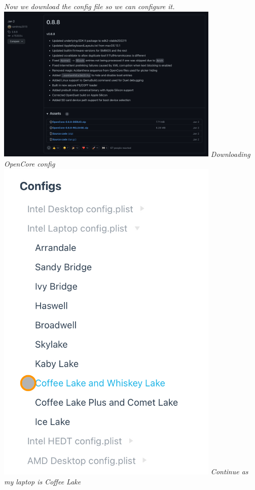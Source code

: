 \documentclass[12pt, letterpaper]{article}
\begin{document}
\break
\emph{Now we download the config file so we can configure it.}
\hfill\break
\hfill\break
\includegraphics[width=0.8\textwidth]{fotos/PSP/Research header/Downloadopencore.jpeg}
\break
\emph{Downloading OpenCore config}
\hfill\break
\hfill\break
\includegraphics[width=0.8\textwidth]{fotos/PSP/Research header/Laptopconfig.jpeg}
\break
\emph{Continue as my laptop is Coffee Lake}
\hfill\break
\hfill\break
\end{document}
